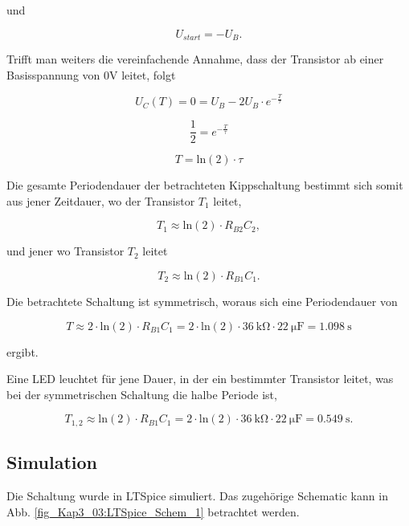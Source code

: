 und 

\begin{equation}
    U_{start} = -U_B .
\end{equation}

Trifft man weiters die vereinfachende Annahme, dass der Transistor ab einer Basisspannung von 0V leitet, folgt

\begin{equation}
    U_{C}(T) = 0 = U_B - 2 U_B \cdot e^{-\frac{T}{\tau}}
\end{equation}

\begin{equation}
    \frac{1}{2} = e^{-\frac{T}{\tau}}
\end{equation}

\begin{equation}
    T = \text{ln}(2) \cdot \tau
\end{equation}

Die gesamte Periodendauer der betrachteten Kippschaltung bestimmt sich somit aus jener Zeitdauer, wo der Transistor $T_1$ leitet, 

\begin{equation}
    T_1 \approx \text{ln}(2) \cdot R_{B2}C_2 ,
\end{equation}

und jener wo Transistor $T_2$ leitet

\begin{equation}
    T_2 \approx \text{ln}(2) \cdot R_{B1}C_1 .
\end{equation}

Die betrachtete Schaltung ist symmetrisch, woraus sich eine Periodendauer von

\begin{equation}
    \label{glgn:period}
    T \approx 2 \cdot \text{ln}(2) \cdot R_{B1}C_1 = 2 \cdot \text{ln}(2) \cdot \SI{36}{\kilo\ohm} \cdot \SI{22}{\micro\farad} = \SI{1.098}{\second}
\end{equation}

ergibt.

Eine LED leuchtet für jene Dauer, in der ein bestimmter Transistor leitet, was bei der symmetrischen Schaltung die halbe Periode ist,

\begin{equation}
    T_{1,2} \approx \text{ln}(2) \cdot R_{B1}C_1 = 2 \cdot \text{ln}(2) \cdot \SI{36}{\kilo\ohm} \cdot \SI{22}{\micro\farad} = \SI{0.549}{\second}.
\end{equation}


\subsection{Simulation}
Die Schaltung wurde in LTSpice simuliert. Das zugehörige Schematic kann in Abb. \ref{fig_Kap3_03:LTSpice_Schem_1} betrachtet werden.

